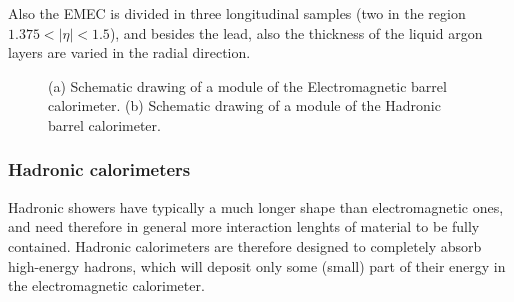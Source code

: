 Also the EMEC is divided in three longitudinal samples (two in the region $1.375<|\eta|<1.5$),
and besides the lead, also the thickness of the liquid argon layers are varied in the
radial direction.

\begin{figure}[tb]\begin{center}
	\caption{(a) Schematic drawing of a module of the Electromagnetic barrel calorimeter. 
        (b) Schematic drawing of a module of the Hadronic barrel calorimeter.}
\end{center}\end{figure}



\subsubsection{Hadronic calorimeters}\label{sec:hadcal}

Hadronic showers have typically a much longer shape than
electromagnetic ones, and need therefore in general more
interaction lenghts of material to be fully contained.
Hadronic calorimeters are therefore designed to completely
absorb high-energy hadrons, which will deposit only some (small) part of their energy 
in the electromagnetic calorimeter.



